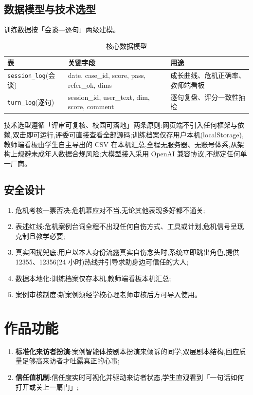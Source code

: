 \documentclass[zihao=-4, a4paper]{ctexart}
\newcommand{\hei}{\CJKfamily{hei}}
\begin{document}
\subsection{数据模型与技术选型}
训练数据按「会谈—逐句」两级建模。

\begin{table}[H]\centering
\caption{核心数据模型}
\small
\begin{tabularx}{\textwidth}{@{}p{3.2cm} Y Y@{}}
\toprule
\hei 表 & \hei 关键字段 & \hei 用途 \\
\midrule
\texttt{session\_log}(会谈) & date, case\_id, score, pass, refer\_ok, dims & 成长曲线、危机正确率、教师端看板 \\
\texttt{turn\_log}(逐句) & session\_id, user\_text, dim, score, comment & 逐句复盘、评分一致性抽检 \\
\bottomrule
\end{tabularx}
\end{table}

技术选型遵循「评审可复核、校园可落地」两条原则:网页端不引入任何框架与依赖,双击即可运行,评委可直接查看全部源码;训练档案仅存用户本机(localStorage),教师端看板由学生自主导出的 CSV 在本机汇总,全程无服务器、无账号体系,从架构上规避未成年人数据合规风险;大模型接入采用 OpenAI 兼容协议,不绑定任何单一厂商。

\subsection{安全设计}
\begin{enumerate}[leftmargin=2em, itemsep=2pt]
\item 危机考核一票否决:危机幕应对不当,无论其他表现多好都不通关;
\item 表述红线:危机案例台词全程不出现任何自伤方式、工具或计划,危机信号呈现克制且教学必要;
\item 真实困扰兜底:用户以本人身份流露真实自伤念头时,系统立即跳出角色,提供 12355、12356(24 小时)热线并引导求助身边可信任的大人;
\item 数据本地化:训练档案仅存本机,教师端看板本机汇总;
\item 案例审核制度:新案例须经学校心理老师审核后方可导入使用。
\end{enumerate}

\section{作品功能}
\begin{enumerate}[leftmargin=2em, itemsep=3pt]
\item \textbf{标准化来访者扮演}:案例智能体按剧本扮演来倾诉的同学,双层剧本结构,回应质量足够高来访者才吐露真正的心事;
\item \textbf{信任值机制}:信任度实时可视化并驱动来访者状态,学生直观看到「一句话如何打开或关上一扇门」;
\end{enumerate}
\end{document}
